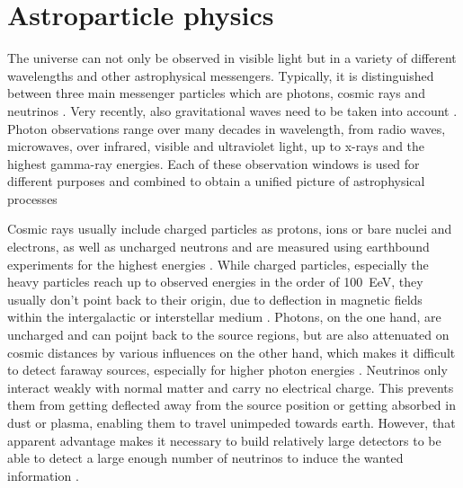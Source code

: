 \chapter{Astroparticle physics}
  \label{chap:astro}

The universe can not only be observed in visible light but in a variety of different wavelengths and other astrophysical messengers.
Typically, it is distinguished between three main messenger particles which are photons, cosmic rays and neutrinos \cite{Cirkel-Bartelt2008,Giovanelli:2009,Learned:2000sw,Halzen:2016gng}.
Very recently, also gravitational waves need to be taken into account \cite{Abbott:2016blz,TheLIGOScientific:2017qsa}.
Photon observations range over many decades in wavelength, from radio waves, microwaves, over infrared, visible and ultraviolet light, up to x-rays and the highest gamma-ray energies.
Each of these observation windows is used for different purposes and combined to obtain a unified picture of astrophysical processes \cite{Wootten:2009qb,Liu:2018wot,Adam:2015rua,Werner:2004zk,Dalal:2017lpy,Lallo:2012hubble,Sembach:1998gc,ODell:2010:xray,TheFermi-LAT:2017pvy,Tibolla:2012magic,Lauer:2015hawc}

Cosmic rays usually include charged particles as protons, ions or bare nuclei and electrons, as well as uncharged neutrons and are measured using earthbound experiments for the highest energies \cite{Horandel:2015tpa,Yoon:2017qjx,PierreAugerSurface,PierreAugerFluorescence}.
While charged particles, especially the heavy particles reach up to observed energies in the order of \SI{100}{\exa\eV}, they usually don't point back to their origin, due to deflection in magnetic fields within the intergalactic or interstellar medium \cite{MedinaTanco:1997rt}.
Photons, on the one hand, are uncharged and can poijnt back to the source regions, but are also attenuated on cosmic distances by various influences on the other hand, which makes it difficult to detect faraway sources, especially for higher photon energies \cite{GilmoreGammaRayAtt}.
Neutrinos only interact weakly with normal matter and carry no electrical charge.
This prevents them from getting deflected away from the source position or getting absorbed in dust or plasma, enabling them to travel unimpeded towards earth.
However, that apparent advantage makes it necessary to build relatively large detectors to be able to detect a large enough number of neutrinos to induce the wanted information \cite{Katz:2011ke,Anchordoqui:2013dnh}.

